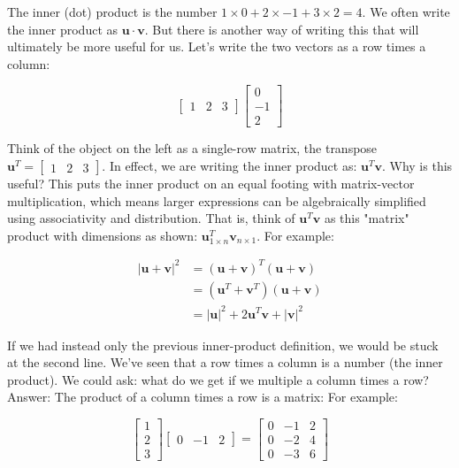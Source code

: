 \documentclass[main.tex]{subfiles}
\begin{document}
The inner (dot) product is the number $1 \times 0+2 \times-1+3 \times 2=4$. We often write the inner product as $\mathbf{u} \cdot \mathbf{v}$. But there is another way of writing this that will ultimately be more useful for us. Let's write the two vectors as a row times a column:

$$
\left[\begin{array}{lll}
1 & 2 & 3
\end{array}\right]\left[\begin{array}{c}
0 \\
-1 \\
2
\end{array}\right]
$$

Think of the object on the left as a single-row matrix, the transpose $\mathbf{u}^{T}=\left[\begin{array}{lll} 1 & 2 & 3 \end{array}\right]$. In effect, we are writing the inner product as: $\mathbf{u}^{T} \mathbf{v}$. Why is this useful? This puts the inner product on an equal footing with matrix-vector multiplication, which means larger expressions can be algebraically simplified using associativity and distribution. That is, think of $\mathbf{u}^{T} \mathbf{v}$ as this "matrix" product with dimensions as shown: $\mathbf{u}_{1 \times n}^{T} \mathbf{v}_{n \times 1}$. For example:

$$
\begin{aligned}
|\mathbf{u}+\mathbf{v}|^{2} &=(\mathbf{u}+\mathbf{v})^{T}(\mathbf{u}+\mathbf{v}) \\
&=\left(\mathbf{u}^{T}+\mathbf{v}^{T}\right)(\mathbf{u}+\mathbf{v}) \\
&=|\mathbf{u}|^{2}+2 \mathbf{u}^{T} \mathbf{v}+|\mathbf{v}|^{2}
\end{aligned}
$$

If we had instead only the previous inner-product definition, we would be stuck at the second line. We've seen that a row times a column is a number (the inner product). We could ask: what do we get if we multiple a column times a row? Answer: The product of a column times a row is a matrix: For example:

$$
\left[\begin{array}{l}
1 \\
2 \\
3
\end{array}\right]\left[\begin{array}{lll}
0 & -1 & 2
\end{array}\right]=\left[\begin{array}{lll}
0 & -1 & 2 \\
0 & -2 & 4 \\
0 & -3 & 6
\end{array}\right]
$$
\end{document}
